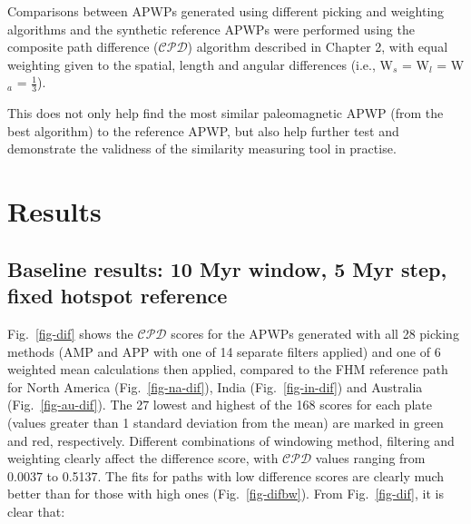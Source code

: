 Comparisons between APWPs generated using different picking and weighting
algorithms and the synthetic reference APWPs were performed using the composite
path difference ($\mathcal{CPD}$) algorithm described in Chapter 2, with equal
weighting given to the spatial, length and angular differences (i.e., W$_s$ =
W$_l$ = W$_a$ = $\frac{1}{3}$).

This does not only help find the most similar paleomagnetic APWP (from the best
algorithm) to the reference APWP, but also help further test and demonstrate the
validness of the similarity measuring tool in practise.

\section{Results}

\subsection{Baseline results: 10 Myr window, 5 Myr step, fixed hotspot
reference}

Fig.~\ref{fig-dif} shows the $\mathcal{CPD}$ scores for the APWPs generated with
all 28 picking methods (AMP and APP with one of 14 separate filters applied) and
one of 6 weighted mean calculations then applied, compared to the FHM reference
path for North America (Fig.~\ref{fig-na-dif}), India (Fig.~\ref{fig-in-dif})
and Australia (Fig.~\ref{fig-au-dif}). The 27 lowest and highest of the 168
scores for each plate (values greater than 1 standard deviation from the mean)
are marked in green and red, respectively. Different combinations of windowing
method, filtering and weighting clearly affect the difference score, with
$\mathcal{CPD}$ values ranging from 0.0037 to 0.5137. The fits for paths with
low difference scores are clearly much better than for those with high ones
(Fig.~\ref{fig-difbw}). From Fig.~\ref{fig-dif}, it is clear that:

